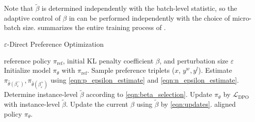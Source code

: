 Note that $\tilde{\beta}$ is determined independently with the batch-level statistic, so the adaptive control of $\beta$ in \method{} can be performed independently with the choice of micro-batch size.  summarizes the entire training process of \method{}.
\begin{algorithm}[h!]
    \caption{$\varepsilon$-Direct Preference Optimization}\label{alg:edpo}
    \begin{algorithmic}[1]
    \REQUIRE reference policy $\pi_{\text{ref}}$, initial KL penalty coefficient $\beta$, and perturbation size $\varepsilon$
    \STATE Initialize model $\pi_{\theta}$ with $\pi_{\text{ref}}$.
        \STATE Sample preference triplets ($x$, $y^w, y^l$).
        \STATE Estimate $\pi_{\hat{\theta}(\beta^-_\varepsilon)}, \pi_{\hat{\theta}(\beta^+_\varepsilon)}$ using \ref{eqn:p_epsilon_estimate} and \ref{eqn:n_epsilon_estimate}.
        \STATE Determine instance-level $\tilde{\beta}$ according to \ref{eqn:beta_selection}.
        \STATE Update $\pi_{\theta}$ by $\mathcal{L}_{\text{DPO}}$ with instance-level $\tilde{\beta}$.
        \STATE Update the current $\beta$ using $\tilde{\beta}$ by \ref{eqn:updates}.
    \ENDWHILE
\RETURN aligned policy $\pi_{\theta}$.
\end{algorithmic}
\end{algorithm}